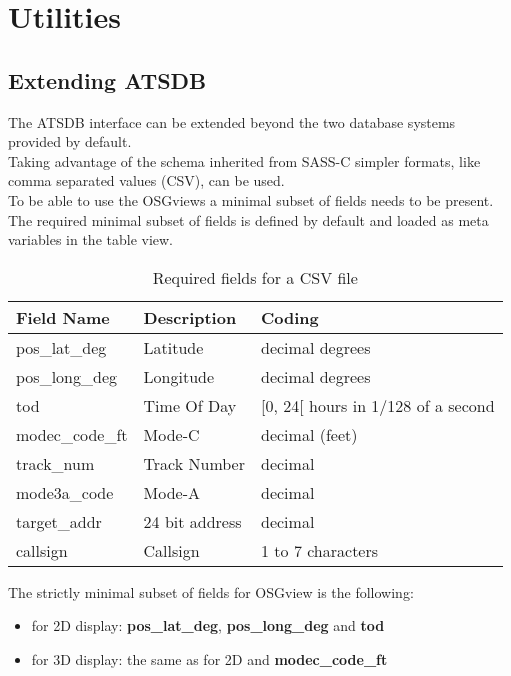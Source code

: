 \chapter{Utilities}
\section{Extending ATSDB}
\label{sec:Extending ATSDB}

The ATSDB interface can be extended beyond the two database systems provided by default. \\

Taking advantage of the schema inherited from SASS-C simpler formats, like comma separated values (CSV), can be used. \\

To be able to use the OSGviews a minimal subset of fields needs to be present. The required minimal subset of fields is defined by default and loaded as meta variables in the table view. \\

\begin{table}[H]
  \center
  \begin{tabular}{ | l | l | l |}
    \hline
    \textbf{Field Name} & \textbf{Description} & \textbf{Coding} \\ \hline
    pos\_lat\_deg & Latitude & decimal degrees \\ \hline
    pos\_long\_deg & Longitude & decimal degrees \\ \hline
    tod & Time Of Day & [0, 24[ hours in 1/128 of a second \\ \hline
    modec\_code\_ft & Mode-C & decimal (feet) \\ \hline
    track\_num & Track Number & decimal \\ \hline
    mode3a\_code & Mode-A & decimal \\ \hline
    target\_addr & 24 bit address & decimal \\ \hline
    callsign & Callsign & 1 to 7 characters \\ \hline
  \end{tabular}
  \caption{Required fields for a CSV file}
\end{table}

The strictly minimal subset of fields for OSGview is the following:
\begin{itemize}
\item for 2D display: \textbf{pos\_lat\_deg}, \textbf{pos\_long\_deg} and \textbf{tod}
\item for 3D display: the same as for 2D and \textbf{modec\_code\_ft}
\\
\end{itemize}

